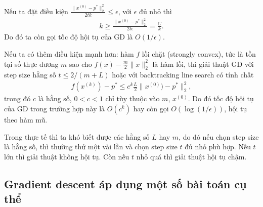 \documentclass{book}
\begin{document}
Nếu ta đặt điều kiện $\frac{\|x^{(0)} - p^*\|^2_2}{2tk} \leq \epsilon$, với $\epsilon$ đủ nhỏ thì 
\begin{align*}
k \geq \frac{\|x^{(0)} - p^*\|^2_2}{2t \epsilon} = \frac{C}{k}.
\end{align*}
Do đó ta còn gọi tốc độ hội tụ của GD là $O(1/\epsilon)$.

Nếu ta có thêm điều kiện mạnh hơn: hàm $f$ lồi chặt (strongly convex), tức là tồn tại số thực dương $m$ sao cho $f(x) - \frac{m}{2}\|x\|^2_2$ là hàm lồi, 
thì giải thuật GD với step size hằng số $t \leq 2/(m+L)$ hoặc với backtracking line search có tính chất
\begin{align*}
f(x^{(k)}) - p^* \leq c^k \frac{L}{2}\|x^{(0)}) - p^*\|^2_2,
\end{align*}
trong đó $c$ là hằng số, $0 <c<1$ chỉ tùy thuộc vào $m$, $x^{(0)}$.
Do đó tốc độ hội tụ của GD trong trường hợp này là $O(c^k)$ hay còn gọi $O(\log(1/\epsilon))$, hội tụ theo hàm mũ.


Trong thực tế thì ta khó biết được các hằng số $L$ hay $m$, do đó nếu chọn step size là hằng số, thì thường thử một vài lần và chọn step size $t$ đủ nhỏ phù hợp. Nếu $t$ lớn thì giải thuật không hội tụ. Còn nếu $t$ nhỏ quá thì giải thuật hội tụ chậm.


\subsection{Gradient descent áp dụng một số bài toán cụ thể}
\end{document}
